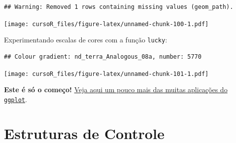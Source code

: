 \documentclass[]{book}
\newenvironment{Shaded}{\begin{snugshade}}{\end{snugshade}}
\newcommand{\KeywordTok}[1]{\textcolor[rgb]{0.13,0.29,0.53}{\textbf{#1}}}
\newcommand{\DataTypeTok}[1]{\textcolor[rgb]{0.13,0.29,0.53}{#1}}
\newcommand{\DecValTok}[1]{\textcolor[rgb]{0.00,0.00,0.81}{#1}}
\newcommand{\StringTok}[1]{\textcolor[rgb]{0.31,0.60,0.02}{#1}}
\newcommand{\CommentTok}[1]{\textcolor[rgb]{0.56,0.35,0.01}{\textit{#1}}}
\newcommand{\OperatorTok}[1]{\textcolor[rgb]{0.81,0.36,0.00}{\textbf{#1}}}
\newcommand{\NormalTok}[1]{#1}
\theoremstyle{definition}
\theoremstyle{definition}
\theoremstyle{definition}
\theoremstyle{remark}
\begin{document}
\begin{verbatim}
## Warning: Removed 1 rows containing missing values (geom_path).
\end{verbatim}

\texttt{[image: cursoR\_files/figure-latex/unnamed-chunk-100-1.pdf]}

Experimentando escalas de cores com a função \texttt{lucky}:

\begin{Shaded}
\end{Shaded}

\begin{verbatim}
## Colour gradient: nd_terra_Analogous_08a, number: 5770
\end{verbatim}

\texttt{[image: cursoR\_files/figure-latex/unnamed-chunk-101-1.pdf]}

\textbf{Este é só o começo!}
\href{http://r-statistics.co/Top50-Ggplot2-Visualizations-MasterList-R-Code.html}{Veja
aqui um pouco mais das muitas aplicações do \texttt{ggplot}}.

\chapter{Estruturas de Controle}\label{loop}
\end{document}

